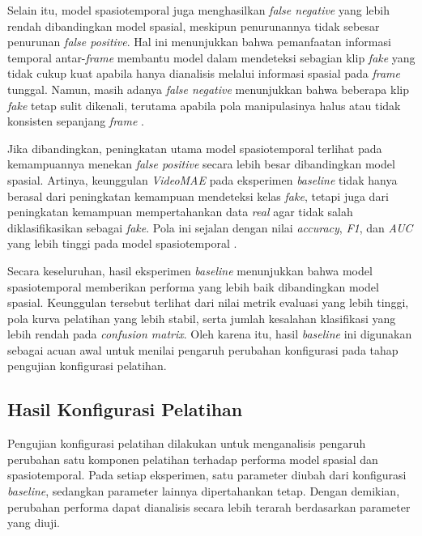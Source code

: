 Selain itu, model spasiotemporal juga menghasilkan \textit{false negative} yang lebih rendah dibandingkan model spasial, meskipun penurunannya tidak sebesar penurunan \textit{false positive}. Hal ini menunjukkan bahwa pemanfaatan informasi temporal antar-\textit{frame} membantu model dalam mendeteksi sebagian klip \textit{fake} yang tidak cukup kuat apabila hanya dianalisis melalui informasi spasial pada \textit{frame} tunggal. Namun, masih adanya \textit{false negative} menunjukkan bahwa beberapa klip \textit{fake} tetap sulit dikenali, terutama apabila pola manipulasinya halus atau tidak konsisten sepanjang \textit{frame} \cite{Gu2021,tong2022videomaemaskedautoencodersdataefficient}.

Jika dibandingkan, peningkatan utama model spasiotemporal terlihat pada kemampuannya menekan \textit{false positive} secara lebih besar dibandingkan model spasial. Artinya, keunggulan \textit{VideoMAE} pada eksperimen \textit{baseline} tidak hanya berasal dari peningkatan kemampuan mendeteksi kelas \textit{fake}, tetapi juga dari peningkatan kemampuan mempertahankan data \textit{real} agar tidak salah diklasifikasikan sebagai \textit{fake}. Pola ini sejalan dengan nilai \textit{accuracy}, \textit{F1}, dan \textit{AUC} yang lebih tinggi pada model spasiotemporal \cite{Gu2021,KINGRA2024301817,tong2022videomaemaskedautoencodersdataefficient}.

Secara keseluruhan, hasil eksperimen \textit{baseline} menunjukkan bahwa model spasiotemporal memberikan performa yang lebih baik dibandingkan model spasial. Keunggulan tersebut terlihat dari nilai metrik evaluasi yang lebih tinggi, pola kurva pelatihan yang lebih stabil, serta jumlah kesalahan klasifikasi yang lebih rendah pada \textit{confusion matrix}. Oleh karena itu, hasil \textit{baseline} ini digunakan sebagai acuan awal untuk menilai pengaruh perubahan konfigurasi pada tahap pengujian konfigurasi pelatihan.

\subsection{Hasil Konfigurasi Pelatihan} \label{IV.Eksperimen_Ablation}
Pengujian konfigurasi pelatihan dilakukan untuk menganalisis pengaruh perubahan satu komponen pelatihan terhadap performa model spasial dan spasiotemporal. Pada setiap eksperimen, satu parameter diubah dari konfigurasi \textit{baseline}, sedangkan parameter lainnya dipertahankan tetap. Dengan demikian, perubahan performa dapat dianalisis secara lebih terarah berdasarkan parameter yang diuji.

